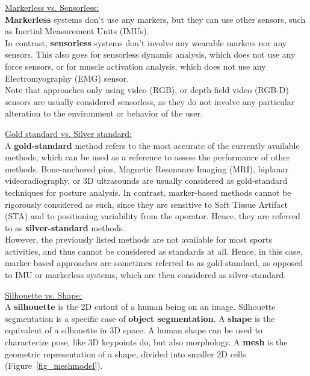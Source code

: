 \vspace*{0.5cm}

\noindent\underline{Markerless vs. Sensorless:}\\
\textbf{Markerless} systems don't use any markers, but they can use other sensors, such as Inertial Measurement Units (IMUs). \\
In contrast, \textbf{sensorless} systems don't involve any wearable markers nor any sensors. This also goes for sensorless dynamic analysis, which does not use any force sensors, or for muscle activation analysis, which does not use any Electromyography (EMG) sensor. \\
Note that approaches only using video (RGB), or depth-field video (RGB-D) sensors are usually considered sensorless, as they do not involve any particular alteration to the environment or behavior of the user.

\vspace*{0.5cm}

\noindent\underline{Gold standard vs. Silver standard:}\\
A \textbf{gold-standard} method refers to the most accurate of the currently available methods, which can be used as a reference to assess the performance of other methods. Bone-anchored pins, Magnetic Resonance Imaging (MRI), biplanar videoradiography, or 3D ultrasounds are usually considered as gold-standard techniques for posture analysis. In contrast, marker-based methods cannot be rigorously considered as such, since they are sensitive to Soft Tissue Artifact (STA) and to positioning variability from the operator. Hence, they are referred to as \textbf{silver-standard} methods. \\
However, the previously listed methods are not available for most sports activities, and thus cannot be considered as standards at all. Hence, in this case, marker-based approaches are sometimes referred to as gold-standard, as opposed to IMU or markerless systems, which are then considered as silver-standard.

\vspace*{0.5cm}

\noindent\underline{Silhouette vs. Shape:}\\
A \textbf{silhouette} is the 2D cutout of a human being on an image. Silhouette segmentation is a specific case of \textbf{object segmentation}. 
A \textbf{shape} is the equivalent of a silhouette in 3D space. A human shape can be used to characterize pose, like 3D keypoints do, but also morphology. A \textbf{mesh} is the geometric representation of a shape, divided into smaller 2D cells (Figure~\ref{fig_meshmodel}).

